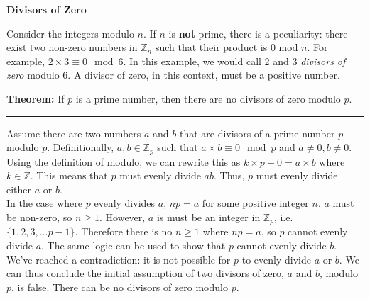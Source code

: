 \documentclass{article}
\begin{document}
\begin{flushleft}
    \LARGE\textbf{Divisors of Zero}\normalsize\\ \vspace{11pt}

    Consider the integers modulo $n$. If $n$ is \textbf{not} prime, there is a peculiarity: there exist two non-zero numbers in $\mathbb{Z}_n$ such that their product is 0 mod $n$. For example, $2 \times 3 \equiv 0 \mod{ 6}$. In this example, we would call 2 and 3 \textit{divisors of zero} modulo 6. A divisor of zero, in this context, must be a positive number.\\ \vspace{6pt}

    \textbf{Theorem: } If $p$ is a prime number, then there are no divisors of zero modulo $p$.\\ \vspace{6pt}
    \hrule\vspace{6pt}
    Assume there are two numbers $a$ and $b$ that are divisors of a prime number $p$ modulo $p$. Definitionally, $a, b \in \mathbb{Z}_p$ such that $a \times b \equiv 0 \mod{p}$ and $a \neq 0, b \neq 0$. Using the definition of modulo, we can rewrite this as $k \times p + 0 = a \times b$ where $k \in \mathbb{Z}$. This means that $p$ must evenly divide $ab$. Thus, $p$ must evenly divide either $a$ or $b$.\\
    In the case where $p$ evenly divides $a$, $np = a$ for some positive integer $n$. $a$ must be non-zero, so $n \geq 1$. However, $a$ is must be an integer in $\mathbb{Z}_{p}$, i.e. $\{1, 2, 3, ... p-1 \}$. Therefore there is no $n \geq 1$ where $np = a$, so $p$ cannot evenly divide $a$. The same logic can be used to show that $p$ cannot evenly divide $b$.\\
    We've reached a contradiction: it is not possible for $p$ to evenly divide $a$ or $b$. We can thus conclude the initial assumption of two divisors of zero, $a$ and $b$, modulo $p$, is false. There can be no divisors of zero modulo $p$.
\end{flushleft}
\end{document}
